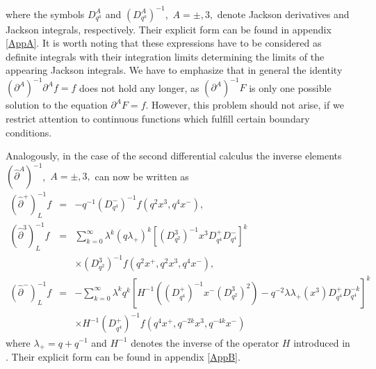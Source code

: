 \documentclass[a4paper,11pt,oneside]{article}
\begin{document}
where the symbols $D_{q^{a}}^{A}$ and $\left( D_{q^{a}}^{A}\right) ^{-1}$, $%
\,A=\pm ,3,$ denote Jackson derivatives and Jackson integrals, respectively.
Their explicit form can be found in appendix \ref{AppA}. It is worth noting
that these expressions have to be considered as definite integrals with
their integration limits determining the limits of the appearing Jackson
integrals. We have to emphasize that in general the identity
$\left(\partial^A \right)^{-1}\partial^Af=f$ does not hold any longer, as 
$\left(\partial^A\right)^{-1}F$ is only one possible solution to the
equation $\partial^AF=f$. However, this problem should not arise, if
we restrict attention to continuous functions which fulfill certain
boundary conditions. 

Analogously, in the case of the second differential calculus the inverse
elements $\left( \hat{\partial}^{A}\right) ^{-1}$, $\,A=\pm ,3,$ can now be
written as 
\begin{eqnarray}
\allowbreak \left( \hat{\partial}^{+}\right) _{L}^{-1}f &=&-q^{-1}\left(
D_{q^{4}}^{-}\right) ^{-1}f\left( q^{2}x^{3},q^{4}x^{-}\right) ,
\label{repres2} \\
\left( \hat{\partial}^{3}\right) _{L}^{-1}f &=&\sum_{k=0}^{\infty }\lambda
^{k}\left( q\lambda _{+}\right) ^{k}\left[ \left( D_{q^{2}}^{3}\right)
^{-1}x^{3}D_{q^{4}}^{+}D_{q^{4}}^{-}\right] ^{k}  \nonumber \\
&&\times \left( D_{q^{2}}^{3}\right) ^{-1}f\left(
q^{2}x^{+},q^{2}x^{3},q^{4}x^{-}\right) ,  \nonumber \\
\left( \hat{\partial}^{-}\right) _{L}^{-1}f &=&-\sum_{k=0}^{\infty }\lambda
^{k}q^{k}\left[ H^{-1}\left( \left( D_{q^{4}}^{+}\right) ^{-1}x^{-}\left(
D_{q^{2}}^{3}\right) ^{2}\right) -q^{-2}\lambda \lambda _{+}\left(
x^{3}\right) D_{q^{4}}^{+}D_{q^{4}}^{-k}\right] ^{k}  \nonumber \\
&&\times H^{-1}\left( D_{q^{4}}^{+}\right) ^{-1}f\left(
q^{4}x^{+},q^{-2k}x^{3},q^{-4k}x^{-}\right)  \nonumber
\end{eqnarray}
\newline
where $\lambda _{+}=q+q^{-1}$ and $H^{-1}$ denotes the inverse of the
operator $H$ introduced in \cite{BW01}. Their explicit form can be found in
appendix \ref{AppB}.
\end{document}
